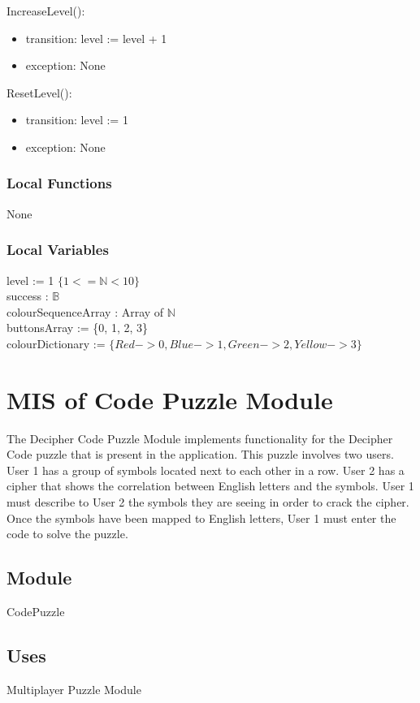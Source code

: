 \documentclass[12pt, titlepage]{article}
\begin{document}
\noindent IncreaseLevel():
\begin{itemize}
\item transition: level := level + 1
\item exception: None
\end{itemize}

\noindent ResetLevel():
\begin{itemize}
\item transition: level := 1
\item exception: None
\end{itemize}

\subsubsection{Local Functions}
None
\subsubsection{Local Variables}
level := 1 $\{1<=\mathbb{N}<10\}$\\
success : $\mathds{B}$\\
colourSequenceArray : Array of $\mathds{N}$\\
buttonsArray := \{0, 1, 2, 3\}\\
colourDictionary := $\{Red -> 0, Blue -> 1, Green -> 2, Yellow -> 3\}$
\newpage

\section{MIS of Code Puzzle Module} \label{Code}
\noindent The Decipher Code Puzzle Module implements functionality for the Decipher Code puzzle that is present in the application. This puzzle involves two users. User 1 has a group of symbols located next to each other in a row. User 2 has a cipher that shows the correlation between English letters and the symbols. User 1 must describe to User 2 the symbols they are seeing in order to crack the cipher. Once the symbols have been mapped to English letters, User 1 must enter the code to solve the puzzle.

\subsection{Module}
CodePuzzle

\subsection{Uses}
Multiplayer Puzzle Module
\end{document}

